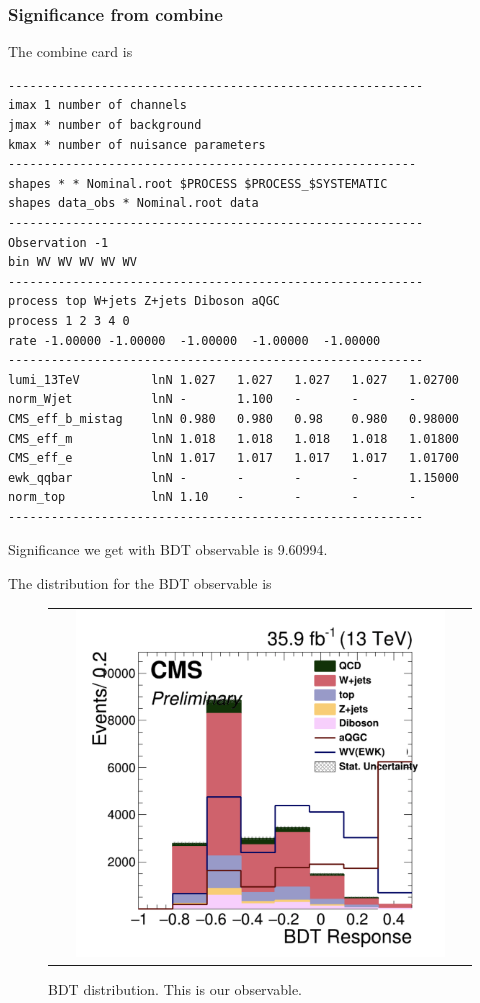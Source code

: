\subsubsection{Significance from combine}
The combine card is
\begin{verbatim}
----------------------------------------------------------
imax 1 number of channels
jmax * number of background
kmax * number of nuisance parameters
---------------------------------------------------------
shapes * * Nominal.root $PROCESS $PROCESS_$SYSTEMATIC
shapes data_obs * Nominal.root data
----------------------------------------------------------
Observation -1
bin WV WV WV WV WV
----------------------------------------------------------
process top W+jets Z+jets Diboson aQGC
process 1 2 3 4 0
rate -1.00000 -1.00000  -1.00000  -1.00000  -1.00000  
----------------------------------------------------------
lumi_13TeV			lnN	1.027	1.027	1.027	1.027	1.02700  
norm_Wjet 			lnN	-		1.100	-		-		-  
CMS_eff_b_mistag	lnN	0.980	0.980	0.98	0.980	0.98000
CMS_eff_m      		lnN	1.018	1.018	1.018	1.018	1.01800
CMS_eff_e      		lnN	1.017	1.017	1.017	1.017	1.01700
ewk_qqbar      		lnN	-		-		-		-		1.15000   
norm_top          	lnN	1.10	-		-		-		-  
----------------------------------------------------------
\end{verbatim}

Significance we get with BDT observable is 9.60994.

The distribution for the BDT observable is 
\begin{figure}[htb]
  \begin{center}
    \begin{tabular}{c}
    \includegraphics[width=0.90\textwidth]{Plots/BDT_Performance/Trial1/BDT_observable.png}    
    \end{tabular}
    \caption{BDT distribution. This is our observable.}
    \label{fig:gen1}
  \end{center}
\end{figure}


